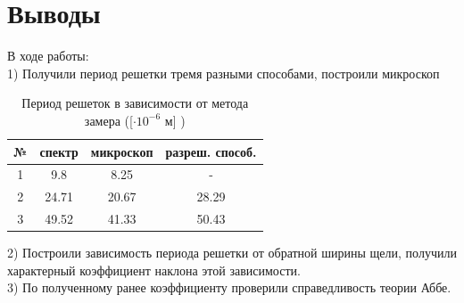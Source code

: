 \documentclass[a4paper, 12pt]{article}%
\begin{document}
	\section{Выводы}
	В ходе работы:\\
	1) Получили период решетки тремя разными способами, построили микроскоп\\
	\begin{table}[H]
		\centering
		\begin{tabular}{|c|c|c|c|}
			\hline
			№ & спектр & микроскоп & разреш. способ. \\ \hline
			1 & 9.8    & 8.25      & -               \\ \hline
			2 & 24.71  & 20.67     & 28.29           \\ \hline
			3 & 49.52  & 41.33     & 50.43           \\ \hline
		\end{tabular}
	\caption{Период решеток в зависимости от метода замера ([$\cdot 10^{-6} $ м] )}
	\end{table}
	2) Построили зависимость периода решетки от обратной ширины щели, получили характерный коэффициент наклона этой зависимости.\\
	3) По  полученному ранее коэффициенту проверили справедливость теории Аббе.
\end{document}
